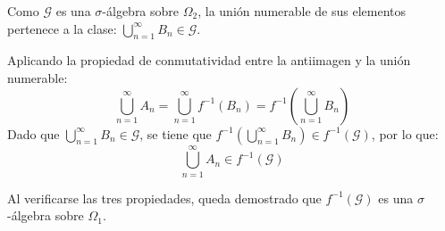 \begin{problema}
\begin{enumerate}
    Como $\mathcal{G}$ es una $\sigma$-álgebra sobre $\Omega_2$, la unión numerable de sus elementos pertenece a la clase: $\bigcup_{n=1}^\infty B_n \in \mathcal{G}$.
    
    Aplicando la propiedad de conmutatividad entre la antiimagen y la unión numerable:
    \[
        \bigcup_{n=1}^\infty A_n = \bigcup_{n=1}^\infty f^{-1}(B_n) = f^{-1}\left( \bigcup_{n=1}^\infty B_n \right)
    \]
    Dado que $\bigcup_{n=1}^\infty B_n \in \mathcal{G}$, se tiene que $f^{-1}\left( \bigcup_{n=1}^\infty B_n \right) \in f^{-1}(\mathcal{G})$, por lo que:
    \[
        \bigcup_{n=1}^\infty A_n \in f^{-1}(\mathcal{G})
    \]
\end{enumerate}

Al verificarse las tres propiedades, queda demostrado que $f^{-1}(\mathcal{G})$ es una $\sigma$-álgebra sobre $\Omega_1$.
\end{problema}

